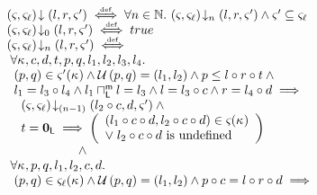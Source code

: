 \begin{definition}
%
\[
\hspace*{-0.2cm}
\begin{array}{l}
	\extendsAM{\amod{}, \amod{\ell}}{l}{r}{\amod{}'} \iffdef \for{n \in \Nats} \extendsAMUpto{\amod{}, \amod{\ell}}{n}{l}{r}{\amod{}'}  \land \amod{}' \subseteq \amod{\ell}\\
	
	
	\extendsAMUpto{\amod{}, \amod{\ell}}{0}{l}{r}{\amod{}'} \iffdef true \\ 



	\extendsAMUpto{\amod{}, \amod{\ell}}{n}{l}{r}{\amod{}'} \iffdef \\ 

	\hspace*{0.1cm}\for{\ca{}, c, d, t, p, q, l_1, l_2, l_3, l_4}\\
	
	\hspace*{0.2cm}(p, q) \in \amod{}'(\ca{}) 
	\land \updateFP{p, q} = (l_1, l_2)
	\land p \leq  l \composeL r \composeL t \land\null\\
	
	\hspace*{0.2cm}l_1 = l_3 \composeL l_4 
	\land l_1 \maxMeetL l = l_3 
	\land l = l_3 \composeL c 
	\land r = l_4 \composeL d \implies\\
	
	\hspace*{0.4cm} \extendsAMUpto{\amod{}, \amod{\ell}}{(n-1)}{l_2 \composeL c}{d}{\amod{}'} \land\null\\
	\hspace*{0.4cm}t = \unitL \implies 
	\left(
	\begin{array}{l}
		(l_1 \composeL c \composeL d, l_2 \composeL c \composeL d) \in \amod{}(\ca{})\\
		\lor\; l_2 \composeL c \composeL d \text{ is undefined} 
	\end{array}
	\right)\\
	
		\hspace*{2cm} \land\\
	

  \hspace*{0.1cm}\for{\ca{}, p, q, l_1, l_2, c, d} \\
  
  \hspace*{0.2cm} (p, q) \in \amod{\ell}(\ca{})
  \land \updateFP{p, q} = (l_1, l_2)
  \land p \composeL c = l \composeL r \composeL d \implies\\
  

\end{array}\]
\end{definition}
